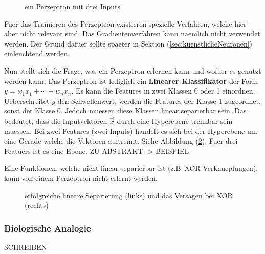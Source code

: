 \documentclass[../main]{subfiles}
\begin{document}
\begin{figure}[h!]
  \centering
  \caption{ein Perzeptron mit drei Inputs}
  \label{fi:perzeptron}
\end{figure}

Fuer das Trainieren des Perzeptron existieren spezielle Verfahren, welche hier
aber nicht relevant sind. Das Gradientenverfahren kann naemlich nicht verwendet
werden. Der Grund dafuer sollte spaeter in Sektion (\ref{sec:kuenstlicheNeuronen}) einleuchtend werden.
\par\medskip
Nun stellt sich die Frage, was ein Perzeptron erlernen kann und wofuer es genutzt werden kann.
Das Perzeptron ist lediglich ein \textbf{Linearer Klassifikator} der Form
$y=w_1x_1+\cdots+w
_nx_n$.
Es kann die Features in zwei Klassen 0 oder 1 einordnen.
Ueberschreitet $y$ den Schwellenwert, werden die Features der Klasse 1 zugeordnet, sonst
der Klasse 0.
Jedoch muessen diese Klassen linear separierbar sein.
Das bedeutet, dass die Inputvektoren $\vec{x}$ durch eine Hyperebene trennbar
sein muessen.
Bei zwei Features (zwei Inputs) handelt es sich bei der Hyperebene um eine
Gerade welche die Vektoren auftrennt. Siehe Abbildung (\ref{fig:linearer_Klassifikator}).
Fuer drei Featuers ist es eine Ebene.
ZU ABSTRAKT -> BEISPIEL

Eine Funktionen, welche nicht linear separierbar ist (z.B\ XOR-Verknuepfungen),
kann von einem Perzeptron nicht erlernt werden.

\begin{figure}[h!]

  \caption{erfolgreiche lineare Separierung (links) und das Versagen bei XOR (rechts)}
  \label{fig:linearer_Klassifikator}
\end{figure}

\cite{wiki:perzeptron}

\subsubsection{Biologische Analogie}
SCHREIBEN
\end{document}
